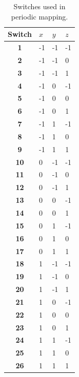 \documentclass[11pt]{article}
\begin{document}
\begin{table}[]
    \caption{Switches used in periodic mapping.}
    \centering
    \begin{tabular}{|c|l|l|l|}
    \hline
    \textbf{Switch} & $x$ & $y$ & $z$ \\ \hline
    \textbf{1}          & -1  & -1  & -1  \\ \hline
    \textbf{2}          & -1  & -1  & 0   \\ \hline
    \textbf{3}          & -1  & -1  & 1   \\ \hline
    \textbf{4}          & -1  & 0   & -1  \\ \hline
    \textbf{5}          & -1  & 0   & 0   \\ \hline
    \textbf{6}          & -1  & 0   & 1   \\ \hline
    \textbf{7}          & -1  & 1   & -1  \\ \hline
    \textbf{8}          & -1  & 1   & 0   \\ \hline
    \textbf{9}          & -1  & 1   & 1   \\ \hline
    \textbf{10}         & 0   & -1  & -1  \\ \hline
    \textbf{11}         & 0   & -1  & 0   \\ \hline
    \textbf{12}         & 0   & -1  & 1   \\ \hline
    \textbf{13}         & 0   & 0   & -1  \\ \hline
    \textbf{14}         & 0   & 0   & 1   \\ \hline
    \textbf{15}         & 0   & 1   & -1  \\ \hline
    \textbf{16}         & 0   & 1   & 0   \\ \hline
    \textbf{17}         & 0   & 1   & 1   \\ \hline
    \textbf{18}         & 1   & -1  & -1  \\ \hline
    \textbf{19}         & 1   & -1  & 0   \\ \hline
    \textbf{20}         & 1   & -1  & 1   \\ \hline
    \textbf{21}         & 1   & 0   & -1  \\ \hline
    \textbf{22}         & 1   & 0   & 0   \\ \hline
    \textbf{23}         & 1   & 0   & 1   \\ \hline
    \textbf{24}         & 1   & 1   & -1  \\ \hline
    \textbf{25}         & 1   & 1   & 0   \\ \hline
    \textbf{26}         & 1   & 1   & 1   \\ \hline
    \end{tabular}
    \label{tab:switches}
\end{table}
\end{document}
